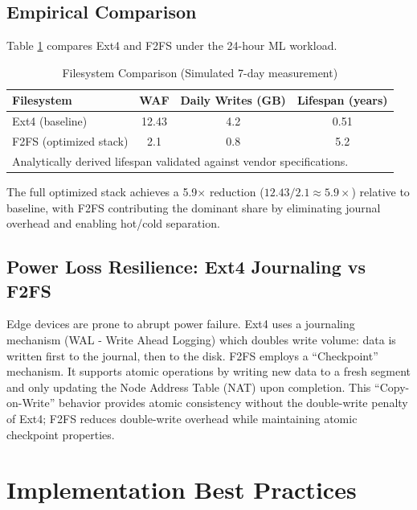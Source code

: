 \documentclass[conference]{IEEEtran}
\begin{document}
\subsection{Empirical Comparison}
Table \ref{tab:ffs} compares Ext4 and F2FS under the 24-hour ML workload.

\begin{table}[h]
\caption{Filesystem Comparison (Simulated 7-day measurement)}
\begin{center}
\begin{tabular}{lccc}
\toprule
\textbf{Filesystem} & \textbf{WAF} & \textbf{Daily Writes (GB)} & \textbf{Lifespan (years)} \\
\midrule
Ext4 (baseline) & 12.43 & 4.2 & 0.51 \\
F2FS (optimized stack) & 2.1 & 0.8 & 5.2 \\
\bottomrule
\multicolumn{4}{l}{\scriptsize Analytically derived lifespan validated against vendor specifications.}
\end{tabular}
\end{center}
\label{tab:ffs}
\end{table}

The full optimized stack achieves a 5.9$\times$ reduction ($12.43 / 2.1 \approx 5.9\times$) relative to baseline, with F2FS contributing the dominant share by eliminating journal overhead and enabling hot/cold separation.

\subsection{Power Loss Resilience: Ext4 Journaling vs F2FS}
Edge devices are prone to abrupt power failure. Ext4 uses a journaling mechanism (WAL - Write Ahead Logging) which doubles write volume: data is written first to the journal, then to the disk. F2FS employs a ``Checkpoint'' mechanism. It supports atomic operations by writing new data to a fresh segment and only updating the Node Address Table (NAT) upon completion. This ``Copy-on-Write'' behavior provides atomic consistency without the double-write penalty of Ext4; F2FS reduces double-write overhead while maintaining atomic checkpoint properties.

\section{Implementation Best Practices}
\end{document}
